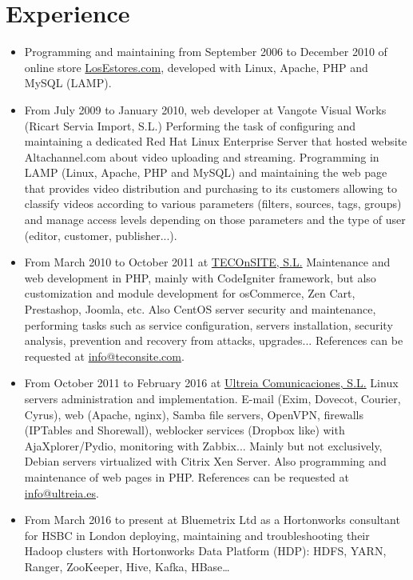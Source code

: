 \documentclass[english]{simplecv}
\begin{document}
\section{Experience}

\begin{itemize}
\item Programming and maintaining from September 2006 to December 2010 of online store \href{http://www.losestores.com}{LosEstores.com},
developed with Linux, Apache, PHP and MySQL (LAMP).
\item From July 2009 to January 2010, web developer at Vangote Visual Works (Ricart Servia Import, S.L.)\newline
Performing the task of configuring and maintaining a dedicated Red Hat Linux Enterprise Server that
hosted website Altachannel.com about video uploading and streaming.\newline
Programming in LAMP (Linux, Apache, PHP and MySQL) and maintaining the web page that provides video distribution and purchasing to
its customers allowing to classify videos according to various parameters (filters, sources, tags, groups) and manage access levels depending on those
parameters and the type of user (editor, customer, publisher...).
\item From March 2010 to October 2011 at \href{http://www.teconsite.com}{TECOnSITE, S.L.}\newline
Maintenance and web development in PHP, mainly with CodeIgniter framework,
but also customization and module development for osCommerce, Zen Cart, Prestashop, Joomla, etc. Also CentOS server security and maintenance, performing tasks such as
service configuration, servers installation, security analysis, prevention and recovery from attacks, upgrades...\newline
References can be requested at \href{mailto:info@teconsite.com}{info@teconsite.com}.
\item From October 2011 to February 2016 at \href{http://www.ultreia.es}{Ultreia Comunicaciones, S.L.}\newline
Linux servers administration and implementation. E-mail (Exim, Dovecot, Courier, Cyrus), web (Apache, nginx),
Samba file servers, OpenVPN, firewalls (IPTables and Shorewall), weblocker services (Dropbox like) with AjaXplorer/Pydio, monitoring with Zabbix...\newline
Mainly but not exclusively, Debian servers virtualized with Citrix Xen Server.\newline
Also programming and maintenance of web pages in PHP.\newline
References can be requested at \href{mailto:info@ultreia.es}{info@ultreia.es}.
\item From March 2016 to present at Bluemetrix Ltd as a Hortonworks consultant for HSBC in London deploying, maintaining and troubleshooting their Hadoop clusters with Hortonworks Data Platform (HDP): HDFS, YARN, Ranger, ZooKeeper, Hive, Kafka, HBase…
\end{itemize}
\end{document}
